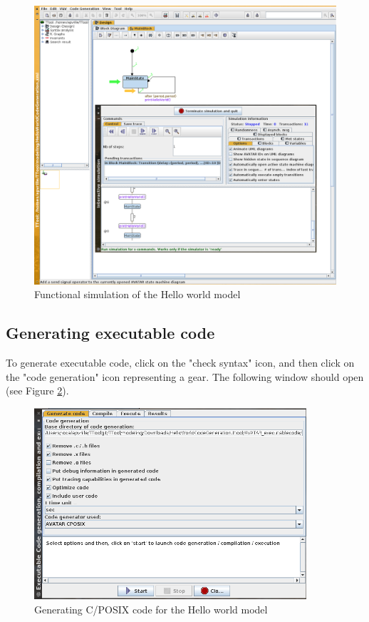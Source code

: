 \documentclass[12pt]{article}
\begin{document}
\begin{figure}[htbp]
\centering
\includegraphics[width=1\textwidth]{figures/simulationhelloworld}
\caption{Functional simulation of the Hello world model} \label{fig:simuhelloworld}
\end{figure}

\subsection{Generating executable code}
To generate executable code, click on the "check syntax" icon, and then click on the "code generation" icon representing a gear. The following window should open (see Figure \ref{fig:codegenhelloworld}).

\begin{figure}[htbp]
\centering
\includegraphics[width=0.9\textwidth]{figures/codegenhelloworld}
\caption{Generating C/POSIX code for the Hello world model} \label{fig:codegenhelloworld}
\end{figure}
\end{document}
